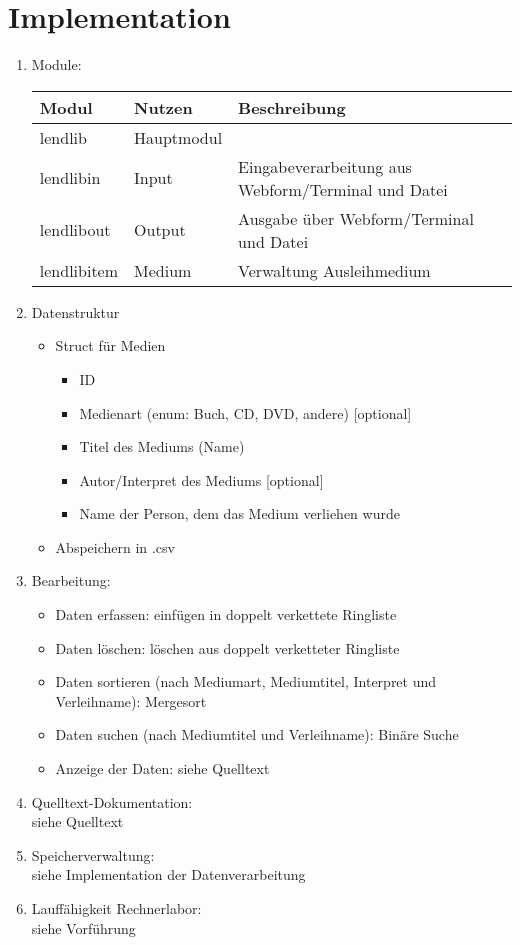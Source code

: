 \section{Implementation}
\begin{enumerate}
\item Module:\\
\begin{tabular}{l l l}
Modul & Nutzen & Beschreibung\\
\hline
lendlib & Hauptmodul & \\
lendlibin & Input & Eingabeverarbeitung aus Webform/Terminal und Datei\\
lendlibout & Output & Ausgabe über Webform/Terminal und Datei\\
lendlibitem & Medium & Verwaltung Ausleihmedium\\
\end{tabular}
\item Datenstruktur
\begin{itemize}
\item Struct für Medien
\begin{itemize}
\item ID
\item Medienart (enum: Buch, CD, DVD, andere) [optional]
\item Titel des Mediums (Name)
\item Autor/Interpret des Mediums [optional]
\item Name der Person, dem das Medium verliehen wurde
\end{itemize}
\item Abspeichern in .csv
\end{itemize}
\item Bearbeitung:
\begin{itemize}
\item Daten erfassen: einfügen in doppelt verkettete Ringliste
\item Daten löschen: löschen aus doppelt verketteter Ringliste
\item Daten sortieren (nach Mediumart, Mediumtitel, Interpret und Verleihname): Mergesort
\item Daten suchen (nach Mediumtitel und Verleihname): Binäre Suche
\item Anzeige der Daten: siehe Quelltext
\end{itemize}
\item Quelltext-Dokumentation:\\
siehe Quelltext
\item Speicherverwaltung:\\
siehe Implementation der Datenverarbeitung
\item Lauffähigkeit Rechnerlabor:\\
siehe Vorführung
\end{enumerate}

